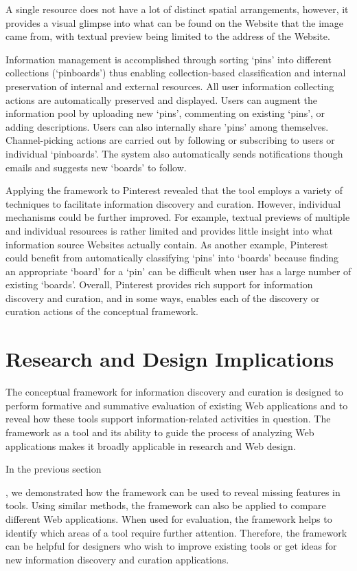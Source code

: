 \documentclass{sigchi}
\newcommand{\feature}[1]{{\ttfamily#1}}
\begin{document}
{{A single resource does not have a lot of distinct spatial arrangements, however, it provides a visual glimpse into what can be found on the Website that the image came from, with \feature{textual preview} being limited to the address of the Website. 

Information management is accomplished through sorting `pins' into different collections (`pinboards') thus enabling \feature{collection-based classification} and \feature{internal preservation of internal and external resources}. All user information collecting actions are \feature{automatically} preserved and displayed. Users can augment the information pool by uploading new `pins', commenting on existing `pins', or adding descriptions. Users can also \feature{internally share} 'pins' among themselves. Channel-picking actions are carried out by following or \feature{subscribing} to users or individual `pinboards'. The system also \feature{automatically} sends \feature{notifications} though emails and \feature{suggests} new `boards' to follow.

Applying the framework to Pinterest revealed that the tool employs a  variety of techniques to facilitate information discovery and curation. However, individual mechanisms could be further improved. For example, \feature{textual previews} of multiple and individual resources is rather limited and provides little insight into what information source Websites actually contain. As another example, Pinterest could benefit from \feature{automatically classifying} `pins' into `boards' because finding an appropriate `board' for a `pin' can be difficult when user has a large number of existing `boards'. Overall, Pinterest provides rich support for information discovery and curation, and in some ways, enables each of the discovery or curation actions of the conceptual framework. 
} %

\section{Research and Design Implications}
\label{section:implications}
The conceptual framework for information discovery and curation is designed to perform formative and summative evaluation of existing Web applications and to reveal how these tools support information-related activities in question. The framework as a tool and its ability to guide the process of analyzing Web applications makes it broadly applicable in research and Web design. 

In the previous section}, we demonstrated how the framework can be used to reveal missing features in tools. Using similar methods, the framework can also be applied to compare different Web applications. When used for evaluation, the framework helps to identify which areas of a tool require further attention. Therefore, the framework can be helpful for designers who wish to improve existing tools or get ideas for new information discovery and curation applications. 
\end{document}

